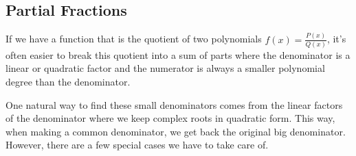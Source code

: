 \subsection{Partial Fractions}
\noindent
If we have a function that is the quotient of two polynomials $f(x) = \frac{P(x)}{Q(x)}$, it's often easier to break this quotient into a sum of parts where the denominator is a linear or quadratic factor and the numerator is always a smaller polynomial degree than the denominator.



\noindent
One natural way to find these small denominators comes from the linear factors of the denominator where we keep complex roots in quadratic form.
This way, when making a common denominator, we get back the original big denominator.
However, there are a few special cases we have to take care of.






